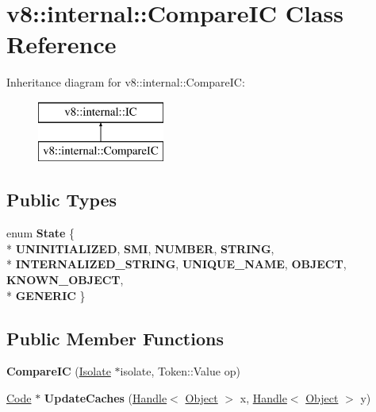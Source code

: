 \hypertarget{classv8_1_1internal_1_1_compare_i_c}{}\section{v8\+:\+:internal\+:\+:Compare\+I\+C Class Reference}
\label{classv8_1_1internal_1_1_compare_i_c}
Inheritance diagram for v8\+:\+:internal\+:\+:Compare\+I\+C\+:\begin{figure}[H]
\begin{center}
\leavevmode
\includegraphics[height=2.000000cm]{classv8_1_1internal_1_1_compare_i_c}
\end{center}
\end{figure}
\subsection*{Public Types}
\begin{DoxyCompactItemize}
\item 
\hypertarget{classv8_1_1internal_1_1_compare_i_c_a575853ef8da2dcef09be7b8e327a2ee9}{}enum {\bfseries State} \{ \\*
{\bfseries U\+N\+I\+N\+I\+T\+I\+A\+L\+I\+Z\+E\+D}, 
{\bfseries S\+M\+I}, 
{\bfseries N\+U\+M\+B\+E\+R}, 
{\bfseries S\+T\+R\+I\+N\+G}, 
\\*
{\bfseries I\+N\+T\+E\+R\+N\+A\+L\+I\+Z\+E\+D\+\_\+\+S\+T\+R\+I\+N\+G}, 
{\bfseries U\+N\+I\+Q\+U\+E\+\_\+\+N\+A\+M\+E}, 
{\bfseries O\+B\+J\+E\+C\+T}, 
{\bfseries K\+N\+O\+W\+N\+\_\+\+O\+B\+J\+E\+C\+T}, 
\\*
{\bfseries G\+E\+N\+E\+R\+I\+C}
 \}\label{classv8_1_1internal_1_1_compare_i_c_a575853ef8da2dcef09be7b8e327a2ee9}

\end{DoxyCompactItemize}
\subsection*{Public Member Functions}
\begin{DoxyCompactItemize}
\item 
\hypertarget{classv8_1_1internal_1_1_compare_i_c_a5e8d9e7f8a97a3bac684944775f51316}{}{\bfseries Compare\+I\+C} (\hyperlink{classv8_1_1internal_1_1_isolate}{Isolate} $\ast$isolate, Token\+::\+Value op)\label{classv8_1_1internal_1_1_compare_i_c_a5e8d9e7f8a97a3bac684944775f51316}

\item 
\hypertarget{classv8_1_1internal_1_1_compare_i_c_a74a0a050b279c5d7d2d862fa28d7d594}{}\hyperlink{classv8_1_1internal_1_1_code}{Code} $\ast$ {\bfseries Update\+Caches} (\hyperlink{classv8_1_1internal_1_1_handle}{Handle}$<$ \hyperlink{classv8_1_1internal_1_1_object}{Object} $>$ x, \hyperlink{classv8_1_1internal_1_1_handle}{Handle}$<$ \hyperlink{classv8_1_1internal_1_1_object}{Object} $>$ y)\label{classv8_1_1internal_1_1_compare_i_c_a74a0a050b279c5d7d2d862fa28d7d594}

\end{DoxyCompactItemize}
